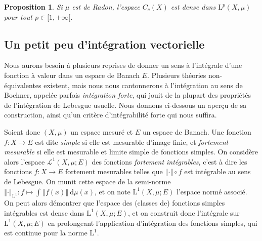 \documentclass[a4paper,12pt]{article}
\newtheorem{proposition}[theorem]{Proposition}
\newcommand{\Bor}{\mathcal{B}}
\newcommand{\norm}[1]{\left\Vert #1\right\Vert}
\newcommand{\integral}[4]{\int_{#1}^{#2} #3~\mathrm{d}#4}
\newcommand{\comp}{\circ}
\begin{document}
\begin{proposition}\label{cont_supp_compact_dense_Lp}
    Si $\mu$ est de Radon, l'espace $C_c(X)$ est dense dans $\mathrm{L}^p(X, \mu)$ pour tout $p\in[1, +\infty[$.
\end{proposition}

%
%     
%
%    

\subsection*{Un petit peu d'intégration vectorielle}

Nous aurons besoin à plusieurs reprises de donner un sens à l'intégrale d'une fonction 
à valeur dans un espace de Banach $E$. Plusieurs théories non-équivalentes existent, 
mais nous nous cantonnerons à l'intégration au sens de Bochner, appelée parfois \emph{intégration forte},
qui jouit de la plupart des propriétés de l'intégration de Lebesgue usuelle. Nous donnons ci-dessous un aperçu de sa 
construction, ainsi qu'un critère d'intégrabilité forte qui nous suffira.

Soient donc $(X, \mu)$ un espace mesuré et $E$ un espace de Banach. Une fonction $f:X\to E$
est dite \emph{simple} si elle est mesurable d'image finie, et \emph{fortement mesurable} si elle est mesurable et limite simple de fonctions simples.
On considère alors l'espace $\mathscr{L}^1(X, \mu; E)$ des fonctions \emph{fortement intégrables}, c'est à dire les fonctions $f:X\to E$
fortement mesurables telles que $\norm{\cdot}\comp f$ est intégrable au sens de Lebesgue. 
On munit cette espace de la semi-norme $\norm{\cdot}_{\mathrm{L}^1} : f\mapsto\integral{}{}{\norm{f(x)}}{\mu(x)}$,
et on note $\mathrm{L}^1(X, \mu; E)$ l'espace normé associé. On peut alors démontrer 
que l'espace des (classes de) fonctions simples intégrables est dense dans $\mathrm{L}^1(X, \mu; E)$,
et on construit donc l'intégrale sur $\mathrm{L}^1(X, \mu; E)$ en prolongeant l'application 
d'intégration des fonctions simples, qui est continue pour la norme $\mathrm{L}^1$.
\end{document}
